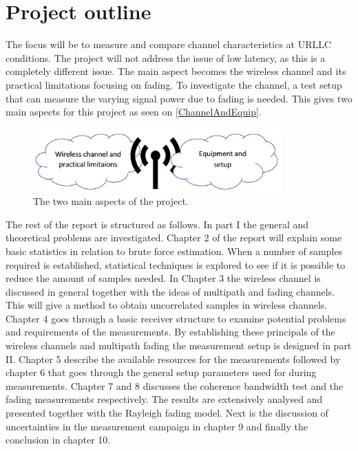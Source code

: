 \section{Project outline}

The focus will be to measure and compare channel characteristics at URLLC conditions. The project will not address the issue of low latency, as this is a completely different issue. The main aspect becomes the wireless channel and its practical limitations focusing on fading. To investigate the channel, a test setup that can measure the varying signal power due to fading is needed. This gives two main aspects for this project as seen on \autoref{ChannelAndEquip}.

\begin{figure}[H]
\centering
\includegraphics[width=0.85\textwidth]{figures/ProOutline.png}
\caption{The two main aspects of the project.}
\label{ChannelAndEquip}
\end{figure}



The rest of the report is structured as follows. In part I the general and theoretical problems are investigated. Chapter 2 of the report will explain some basic statistics in relation to brute force estimation. When a number of samples required is established, statistical techniques is explored to see if it is possible to reduce the amount of samples needed. In Chapter 3 the wireless channel is discussed in general together with  the ideas of multipath and fading channels. This will give a method to obtain uncorrelated samples in wireless channels. Chapter 4 goes through a basic receiver structure to examine potential problems and requirements of the measurements. By establishing these principals of the wireless channels and multipath fading the measurement setup is designed in part II. Chapter 5 describe the available resources for the measurements followed by chapter 6 that goes through the general setup parameters used for during measurements. Chapter 7 and 8 discusses the coherence bandwidth test and the fading measurements respectively. The results are extensively analysed and presented together with the Rayleigh fading model. Next is the discussion of uncertainties in the measurement campaign in chapter 9 and finally the conclusion in chapter 10.

